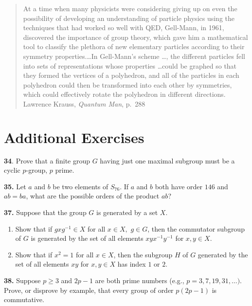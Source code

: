 \documentclass[a4paper,11pt,final]{memoir}%
\theoremstyle{nonumberplain}
\begin{document}
\begin{quote}
{\small At a time when many physicists were considering giving up on even the
possibility of developing an understanding of particle physics using the
techniques that had worked so well with QED, Gell-Mann, in 1961, discovered
the importance of group theory, which gave him a mathematical tool to classify
the plethora of new elementary particles according to their symmetry
properties.\ldots In Gell-Mann's scheme \ldots, the different particles fell
into sets of representations whose properties \ldots could be graphed so that
they formed the vertices of a polyhedron, and all of the particles in each
polyhedron could then be transformed into each other by symmetries, which
could effectively rotate the polyhedron in different directions.\newline%
\hspace*{2.3in} Lawrence Krauss, \textit{Quantum Man}, p.~288 }
\end{quote}

%


\clearpage \appendix


\chapter{Additional Exercises}

\medskip\noindent\textbf{34}. Prove that a finite group $G$ having just one
maximal subgroup must be a cyclic $p$-group, $p$ prime.

\medskip\noindent\textbf{35.} Let $a$ and $b$ be two elements of $S_{76}$. If
$a$ and $b$ both have order $146$ and $ab=ba$, what are the possible orders of
the product $ab$?

\medskip\noindent\textbf{37.} Suppose that the group $G$ is generated by a set
$X$.

\begin{enumerate}
\item Show that if $gxg^{-1}\in X$ for all $x\in X,$ $g\in G$, then the
commutator subgroup of $G$ is generated by the set of all elements
$xyx^{-1}y^{-1}$ for $x,y\in X$.

\item Show that if $x^{2}=1$ for all $x\in X$, then the subgroup $H$ of $G$
generated by the set of all elements $xy$ for $x,y\in X$ has index $1$ or $2 $.
\end{enumerate}

\medskip\noindent\textbf{38.} Suppose $p\geq3$ and $2p-1$ are both prime
numbers (e.g., $p=3,7,19,31,\ldots)$. Prove, or disprove by example, that
every group of order $p(2p-1)$ is commutative.
\end{document}
